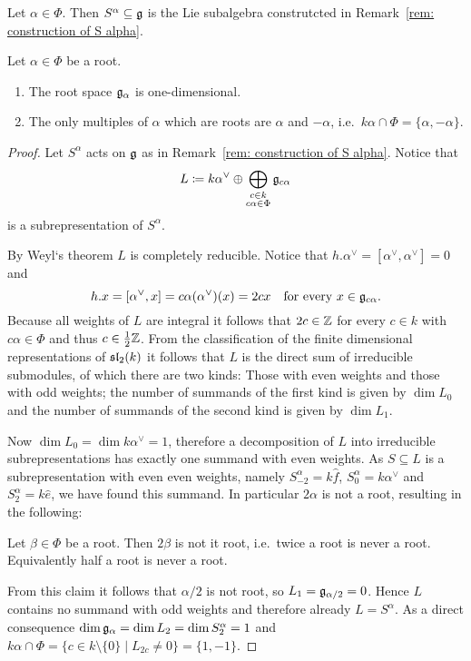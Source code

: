 \begin{defi}
 Let $\alpha \in \Phi$. Then $S^\alpha \subseteq \mathfrak{g}$ is the Lie subalgebra construtcted in Remark~\ref{rem: construction of S alpha}.
\end{defi}


\begin{prop}
 Let $\alpha \in \Phi$ be a root.
 \begin{enumerate}[leftmargin=*]
  \item
   The root space $\mathfrak{g}_\alpha$ is one-dimensional.
  \item
   The only multiples of $\alpha$ which are roots are $\alpha$ and $-\alpha$, i.e.\ $k\alpha \cap \Phi = \{\alpha, -\alpha\}$.
 \end{enumerate}
\end{prop}
\begin{proof}
 Let $S^\alpha$ acts on $\mathfrak{g}$ as in Remark~\ref{rem: construction of S alpha}. Notice that
 \[
  L \coloneqq k \alpha^\vee \oplus \bigoplus_{\substack{c \in k \\ c\alpha \in \Phi}} \mathfrak{g}_{c\alpha}
 \]
 is a subrepresentation of $S^\alpha$.
 
 By Weyl‘s theorem $L$ is completely reducible. Notice that $h.\alpha^\vee = [\alpha^\vee, \alpha^\vee] = 0$ and
 \[
  h.x = [\alpha^\vee, x] = c\alpha(\alpha^\vee)(x) = 2cx
  \quad \text{for every $x \in \mathfrak{g}_{c\alpha}$}.
 \]
 Because all weights of $L$ are integral it follows that $2c \in \mathbb{Z}$ for every $c \in k$ with $c\alpha \in \Phi$ and thus $c \in \frac{1}{2}\mathbb{Z}$. From the classification of the finite dimensional representations of $\mathfrak{sl}_2(k)$ it follows that $L$ is the direct sum of irreducible submodules, of which there are two kinds: Those with even weights and those with odd weights; the number of summands of the first kind is given by $\dim L_0$ and the number of summands of the second kind is given by $\dim L_1$.
 
 Now $\dim L_0 = \dim k\alpha^\vee = 1$, therefore a decomposition of $L$ into irreducible subrepresentations has exactly one summand with even weights. As $S \subseteq L$ is a subrepresentation with even even weights, namely $S^\alpha_{-2} = k\hat{f}$, $S^\alpha_0 = k\alpha^\vee$ and $S^\alpha_2 = k\hat{e}$, we have found this summand. In particular $2\alpha$ is not a root, resulting in the following:
 
 \begin{claim*}
  Let $\beta \in \Phi$ be a root. Then $2\beta$ is not it root, i.e.\ twice a root is never a root. Equivalently half a root is never a root.
 \end{claim*}
 
 From this claim it follows that $\alpha/2$ is not root, so $L_1 = \mathfrak{g}_{\alpha/2} = 0$. Hence $L$ contains no summand with odd weights and therefore already $L = S^\alpha$. As a direct consequence $\dim \mathfrak{g}_\alpha = \dim L_2 = \dim S^\alpha_2 = 1$ and $k\alpha \cap \Phi = \{c \in k \setminus \{0\} \mid L_{2c} \neq 0\} = \{1,-1\}$.
\end{proof}


